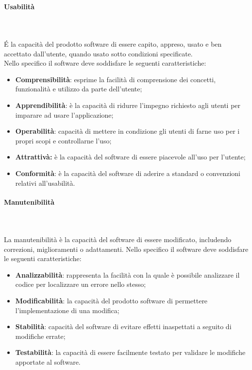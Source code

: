 \paragraph{Usabilità}\mbox{} \\ \mbox{} \\
\'E la capacità del prodotto software di essere capito, appreso, usato e ben accettato dall'utente, quando usato sotto condizioni specificate. \\
Nello specifico il software deve soddisfare le seguenti caratteristiche:
\begin{itemize}
	\item \textbf{Comprensibilità}: esprime la facilità di comprensione dei concetti, funzionalità e utilizzo da parte dell'utente;
	\item \textbf{Apprendibilità}: è la capacità di ridurre l'impegno richiesto agli utenti per imparare ad usare l'applicazione;
	\item \textbf{Operabilità}: capacità di mettere in condizione gli utenti di farne uso per i propri scopi e controllarne l'uso;
	\item \textbf{Attrattivà:} è la capacità del software di essere piacevole all'uso per l'utente;
	\item \textbf{Conformità}: è la capacità del software di aderire a standard o convenzioni relativi all'usabilità.

\end{itemize}
\paragraph{Manutenibilità}\mbox{} \\ \mbox{} \\
La manutenibilità è la capacità del software di essere modificato, includendo correzioni, miglioramenti o adattamenti.
Nello specifico il software deve soddisfare le seguenti caratteristiche:
\begin{itemize}
	\item \textbf{Analizzabilità}: rappresenta la facilità con la quale è possibile analizzare il codice per localizzare un errore nello stesso;
	\item \textbf{Modificabilità}: la capacità del prodotto software di permettere l'implementazione di una modifica;
	\item \textbf{Stabilità}: capacità del software di evitare effetti inaspettati a seguito di modifiche errate;
	\item \textbf{Testabilità}: la capacità di essere facilmente testato per validare le modifiche apportate al software.
\end{itemize}
